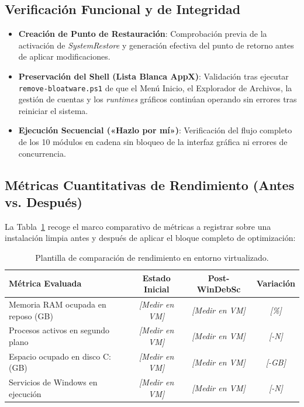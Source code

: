\documentclass[12pt,a4paper]{report}
\begin{document}
\subsection{Verificación Funcional y de Integridad}
\begin{itemize}
    \item \textbf{Creación de Punto de Restauración}: Comprobación previa de la activación de \textit{SystemRestore} y generación efectiva del punto de retorno antes de aplicar modificaciones.
    \item \textbf{Preservación del Shell (Lista Blanca AppX)}: Validación tras ejecutar \texttt{remove-bloatware.ps1} de que el Menú Inicio, el Explorador de Archivos, la gestión de cuentas y los \textit{runtimes} gráficos continúan operando sin errores tras reiniciar el sistema.
    \item \textbf{Ejecución Secuencial («Hazlo por mí»)}: Verificación del flujo completo de los 10 módulos en cadena sin bloqueo de la interfaz gráfica ni errores de concurrencia.
\end{itemize}

\subsection{Métricas Cuantitativas de Rendimiento (Antes vs. Después)}
La Tabla~\ref{tab:metricas-vm} recoge el marco comparativo de métricas a registrar sobre una instalación limpia antes y después de aplicar el bloque completo de optimización:

\begin{table}[h!]
\centering
\begin{tabular}{|l|c|c|c|}
\hline
\textbf{Métrica Evaluada} & \textbf{Estado Inicial} & \textbf{Post-WinDebSc} & \textbf{Variación} \\
\hline
Memoria RAM ocupada en reposo (GB) & \textit{[Medir en VM]} & \textit{[Medir en VM]} & \textit{[\%]} \\
\hline
Procesos activos en segundo plano & \textit{[Medir en VM]} & \textit{[Medir en VM]} & \textit{[-N]} \\
\hline
Espacio ocupado en disco C: (GB) & \textit{[Medir en VM]} & \textit{[Medir en VM]} & \textit{[-GB]} \\
\hline
Servicios de Windows en ejecución & \textit{[Medir en VM]} & \textit{[Medir en VM]} & \textit{[-N]} \\
\hline
\end{tabular}
\caption{Plantilla de comparación de rendimiento en entorno virtualizado.}
\label{tab:metricas-vm}
\end{table}
\end{document}
